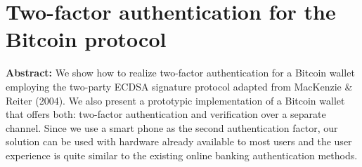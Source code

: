 \section{Two-factor authentication for the Bitcoin protocol}

\textbf{Abstract:} 
We show how to realize two-factor authentication for a Bitcoin wallet employing the two-party ECDSA signature protocol adapted from MacKenzie \& Reiter (2004). We also present a prototypic implementation of a Bitcoin wallet that offers both: two-factor authentication and verification over a separate channel. Since we use a smart phone as the second authentication factor, our solution can be used with hardware already available to most users and the user experience is quite similar to the existing online banking authentication methods.
